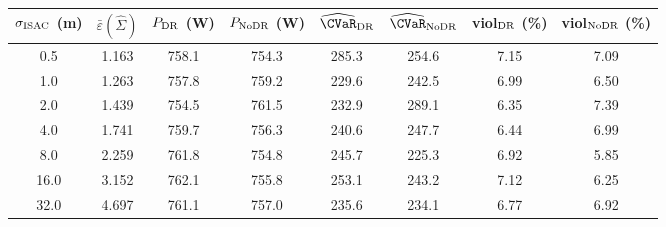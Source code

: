 \begin{tabular}{cccccccc}
\toprule
$\sigma_{\rm ISAC}$ (m) & $\bar\varepsilon(\widehat\Sigma)$ & $P_{\rm DR}$ (W) & $P_{\rm NoDR}$ (W) & $\widehat\CVaR_{\rm DR}$ & $\widehat\CVaR_{\rm NoDR}$ & viol$_{\rm DR}$ (\%) & viol$_{\rm NoDR}$ (\%) \\
\midrule
0.5 & 1.163 & 758.1 & 754.3 & 285.3 & 254.6 & 7.15 & 7.09 \\
1.0 & 1.263 & 757.8 & 759.2 & 229.6 & 242.5 & 6.99 & 6.50 \\
2.0 & 1.439 & 754.5 & 761.5 & 232.9 & 289.1 & 6.35 & 7.39 \\
4.0 & 1.741 & 759.7 & 756.3 & 240.6 & 247.7 & 6.44 & 6.99 \\
8.0 & 2.259 & 761.8 & 754.8 & 245.7 & 225.3 & 6.92 & 5.85 \\
16.0 & 3.152 & 762.1 & 755.8 & 253.1 & 243.2 & 7.12 & 6.25 \\
32.0 & 4.697 & 761.1 & 757.0 & 235.6 & 234.1 & 6.77 & 6.92 \\
\bottomrule
\end{tabular}
